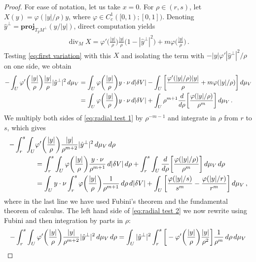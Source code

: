 \documentclass[10pt,reqno]{amsart}
\numberwithin{equation}{section}
\theoremstyle{definition}
\DeclareMathOperator{\Div}{div}
\begin{document}
{{\begin{proof}
    For ease of notation, let us take $x=0$. For $\rho \in (r,s)$, let $X(y) = \varphi(|y|/\rho)y$, where $\varphi \in C_c^1([0,1);[0,1])$. Denoting $\hat y^\perp=\mathbf{proj}_{T_yM^\perp}(y/|y|)$, direct computation yields
\begin{align*}
    \Div_M X = \varphi'\bigg(\frac{|y|}{\rho}\bigg)\frac{|y|}{\rho}\big( 1-|\hat y^\perp|^2\big) + m \varphi\bigg(\frac{|y|}{\rho}\bigg)\,.
\end{align*}
Testing \eqref{eq:first variation} with this $X$ and isolating the term with $-|y|\varphi'|\hat y^\perp|^2/\rho$ on one side, we obtain
\begin{align}\notag
    - \int_U \varphi'\bigg(\frac{|y|}{\rho}\bigg)\frac{|y|}{\rho}|\hat y^\perp|^2 \,d\mu_V &= \int_U \varphi\bigg(\frac{|y|}{\rho}\bigg)y \cdot \nu\, d|\delta V| - \int_U \bigg[\frac{\varphi'(|y|/\rho)|y|}{\rho} + m\varphi(|y|/\rho)\bigg]\,d\mu_V\\ \label{eq:radial test 1}
    &= \int_U \varphi\bigg(\frac{|y|}{\rho}\bigg)y \cdot \nu\, d|\delta V| + \int_U \rho^{m+1}\frac{d}{d\rho}\bigg[\frac{\varphi(|y|/\rho)}{\rho^m}\bigg]\,d\mu_V\,.
\end{align}
We multiply both sides of \eqref{eq:radial test 1} by $\rho^{-m-1}$ and integrate in $\rho$ from $r$ to $s$, which gives
\begin{align}\notag
    -\int_r^s \int_U &\varphi'\bigg(\frac{|y|}{\rho}\bigg)\frac{|y|}{\rho^{m+2}}|\hat y^\perp|^2 \,d\mu_V \, d\rho \\ \notag
    &= \int_r^s\int_U \varphi\bigg(\frac{|y|}{\rho}\bigg)\frac{y \cdot \nu}{\rho^{m+1}}\, d|\delta V|\,d\rho + \int_r^s\int_U \frac{d}{d\rho}\bigg[\frac{\varphi(|y|/\rho)}{\rho^m}\bigg]\,d\mu_V\,d\rho \\ \label{eq:radial test 2}
    &= \int_Uy \cdot \nu\int_r^s \varphi\bigg(\frac{|y|}{\rho}\bigg)\frac{1}{\rho^{m+1}}\,d\rho\, d|\delta V| + \int_U  \bigg[\frac{\varphi(|y|/s)}{s^m}-\frac{\varphi(|y|/r)}{r^m}\bigg]\,d\mu_V\,,
\end{align}
where in the last line we have used Fubini's theorem and the fundamental theorem of calculus. The left hand side of \eqref{eq:radial test 2} we now rewrite using Fubini and then integration by parts in $\rho$:
\begin{align}\notag
    -\int_r^s \int_U \varphi'\bigg(\frac{|y|}{\rho}\bigg)\frac{|y|}{\rho^{m+2}}|\hat y^\perp|^2 \,d\mu_V \, d\rho&= \int_U |\hat y^\perp|^2 \int_r^s \bigg[- \varphi'\bigg(\frac{|y|}{\rho}\bigg) \frac{|y|}{\rho^2}\bigg]\frac{1}{\rho^m}\,d\rho \,d\mu_V \\ \label{eq:radial test 3}

\end{align}
\end{proof}}}
\end{document}
